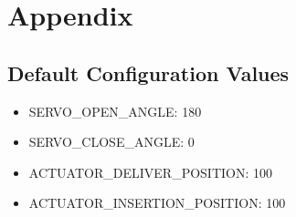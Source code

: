 \documentclass[12pt,a4paper]{article}
\begin{document}
\section{Appendix}
\subsection{Default Configuration Values}
\begin{itemize}
    \item SERVO\_OPEN\_ANGLE: 180
    \item SERVO\_CLOSE\_ANGLE: 0
    \item ACTUATOR\_DELIVER\_POSITION: 100
    \item ACTUATOR\_INSERTION\_POSITION: 100
\end{itemize}
\end{document}
